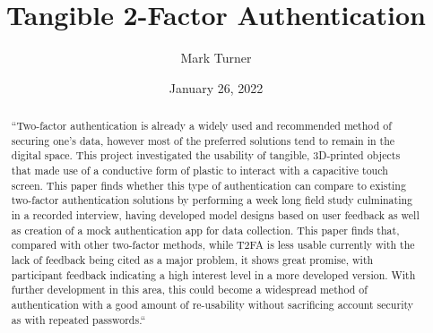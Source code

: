 \documentclass{l4proj}
\begin{document}
\title{Tangible 2-Factor Authentication}
\author{Mark Turner}
\date{January 26, 2022}

\maketitle

\begin{abstract}
   ``Two-factor authentication is already a widely used and recommended method of securing one's data, however most of the preferred solutions tend to remain in the digital space.  This project investigated the usability of tangible, 3D-printed objects that made use of a conductive form of plastic to interact with a capacitive touch screen. This paper finds whether this type of authentication can compare to existing two-factor authentication solutions by performing a week long field study culminating in a recorded interview, having developed model designs based on user feedback as well as creation of a mock authentication app for data collection. This paper finds that, compared with other two-factor methods, while T2FA is less usable currently with the lack of feedback being cited as a major problem, it shows great promise, with participant feedback indicating a high interest level in a more developed version. With further development in this area, this could become a widespread method of authentication with a good amount of re-usability without sacrificing account security as with repeated passwords.``

\end{abstract}


%
%
\def\consentname {Mark Turner} %
\def\consentdate {26 January 2022} %
%
\educationalconsent
\end{document}
